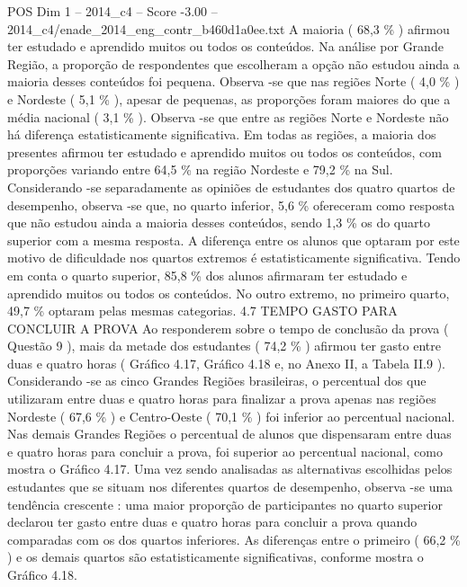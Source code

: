 \begin{textsample}{POS Dim 1 – 2014\_c4 – Score -3.00 – 2014\_c4/enade\_2014\_eng\_contr\_b460d1a0ee.txt}
A maioria ( 68,3 \% ) afirmou ter estudado e aprendido muitos ou todos os conteúdos.
Na análise por Grande Região, a proporção de respondentes que escolheram a opção não estudou ainda a maioria desses conteúdos foi pequena.
Observa -se que nas regiões Norte ( 4,0 \% ) e Nordeste ( 5,1 \% ), apesar de pequenas, as proporções foram maiores do que a média nacional ( 3,1 \% ).
Observa -se que entre as regiões Norte e Nordeste não há diferença estatisticamente significativa.
Em todas as regiões, a maioria dos presentes afirmou ter estudado e aprendido muitos ou todos os conteúdos, com proporções variando entre 64,5 \% na região Nordeste e 79,2 \% na Sul.
Considerando -se separadamente as opiniões de estudantes dos quatro quartos de desempenho, observa -se que, no quarto inferior, 5,6 \% ofereceram como resposta que não estudou ainda a maioria desses conteúdos, sendo 1,3 \% os do quarto superior com a mesma resposta.
A diferença entre os alunos que optaram por este motivo de dificuldade nos quartos extremos é estatisticamente significativa.
Tendo em conta o quarto superior, 85,8 \% dos alunos afirmaram ter estudado e aprendido muitos ou todos os conteúdos.
No outro extremo, no primeiro quarto, 49,7 \% optaram pelas mesmas categorias. 4.7 TEMPO GASTO PARA CONCLUIR A PROVA Ao responderem sobre o tempo de conclusão da prova ( Questão 9 ), mais da metade dos estudantes ( 74,2 \% ) afirmou ter gasto entre duas e quatro horas ( Gráfico 4.17, Gráfico 4.18 e, no Anexo II, a Tabela II.9 ).
Considerando -se as cinco Grandes Regiões brasileiras, o percentual dos que utilizaram entre duas e quatro horas para finalizar a prova apenas nas regiões Nordeste ( 67,6 \% ) e Centro-Oeste ( 70,1 \% ) foi inferior ao percentual nacional.
Nas demais Grandes Regiões o percentual de alunos que dispensaram entre duas e quatro horas para concluir a prova, foi superior ao percentual nacional, como mostra o Gráfico 4.17.
Uma vez sendo analisadas as alternativas escolhidas pelos estudantes que se situam nos diferentes quartos de desempenho, observa -se uma tendência crescente : uma maior proporção de participantes no quarto superior declarou ter gasto entre duas e quatro horas para concluir a prova quando comparadas com os dos quartos inferiores.
As diferenças entre o primeiro ( 66,2 \% ) e os demais quartos são estatisticamente significativas, conforme mostra o Gráfico 4.18.

\end{textsample}
